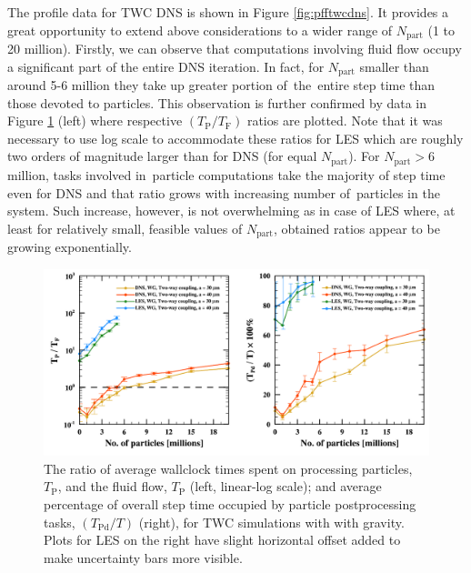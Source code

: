 \documentclass{pracamgren}
\begin{document}
The profile data for TWC DNS is shown in Figure \ref{fig:pfftwcdns}.
It provides a great opportunity to extend above considerations to a wider range of $N_{\text{part}}$ (1 to 20 million).
Firstly, we can observe that computations involving fluid flow occupy a significant part of the entire DNS iteration.
In fact, for $N_{\text{part}}$ smaller than around 5-6 million they take up greater portion of~the~entire step time than those devoted to particles.
This observation is further confirmed by data in Figure \ref{fig:pfftwcex} (left) where respective $(T_{\text{P}} / T_{\text{F}})$ ratios are plotted.
Note that it was necessary to use log scale to accommodate these ratios for LES which are roughly two orders of magnitude larger than for DNS (for equal $N_{\text{part}}$).
For $N_{\text{part}} > 6$ million, tasks involved in~particle computations take the majority of step time even for DNS and that ratio grows with increasing number of~particles in the system.
Such increase, however, is not overwhelming as in case of LES where, at least for relatively small, feasible values of $N_{\text{part}}$, obtained ratios appear to be growing exponentially.

\begin{figure}[h]
\centering
\includegraphics[width=13.5cm]{img/plots/3-3f-pfftwcex.pdf}
\caption{
The ratio of average wallclock times spent on processing particles, $T_{\text{P}}$, and the fluid flow, $T_{\text{P}}$ (left, linear-log scale); and average percentage of overall step time occupied by particle postprocessing tasks, $(T_{\text{Pd}} / T)$ (right), for TWC simulations with with gravity.
Plots for LES on the right have slight horizontal offset added to make uncertainty bars more visible.
}
\label{fig:pfftwcex}
\end{figure}
\end{document}
